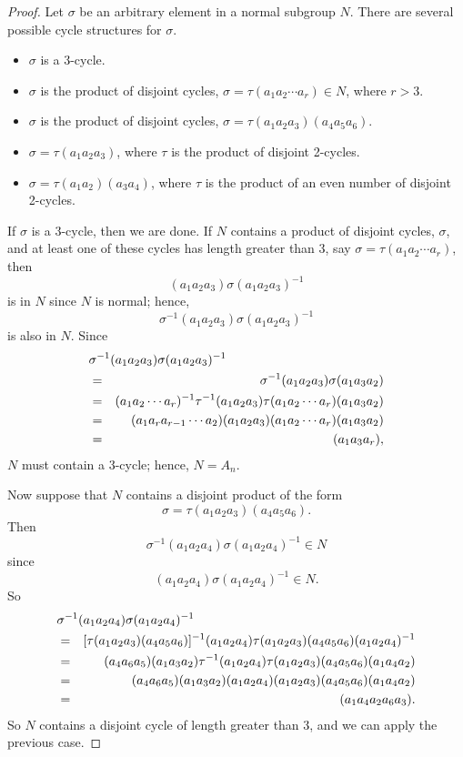  
\begin{proof}
Let $\sigma$ be an arbitrary element in a normal subgroup $N$. There
are several possible cycle structures for $\sigma$.
\begin{itemize}
 
\item
$\sigma$ is a 3-cycle.
 
\item
$\sigma$ is the product of disjoint cycles, $\sigma = \tau(a_1 a_2
\cdots a_r) \in N$, where $r >3$.
 
 
\item
$\sigma$ is the product of disjoint cycles, $\sigma = \tau(a_1 a_2
a_3)(a_4 a_5 a_6)$.
 
 
\item
$\sigma = \tau(a_1 a_2 a_3)$, where $\tau$ is the product of disjoint
2-cycles. 
 
 
\item
$\sigma =
\tau (a_1 a_2) (a_3 a_4) $, where $\tau$ is the product of an even
number of disjoint 2-cycles. 
 
 
\end{itemize}
If $\sigma$ is a $3$-cycle, then we are done. If $N$ contains a
product of disjoint cycles, $\sigma$, and at least one of these cycles
has length greater than 3, say $\sigma = \tau(a_1 a_2 \cdots a_r)$,
then   
$$
(a_1 a_2 a_3)\sigma(a_1 a_2 a_3)^{-1}
$$
is in $N$ since $N$ is normal; hence,
$$
\sigma^{-1}(a_1 a_2 a_3)\sigma(a_1 a_2 a_3)^{-1}
$$
is also in $N$. Since
\begin{eqnarray*}
\lefteqn{\sigma^{-1}(a_1 a_2 a_3)\sigma(a_1 a_2 a_3)^{-1} } \\
& = & \sigma^{-1}(a_1 a_2 a_3)\sigma(a_1 a_3 a_2) \\
& = & (a_1 a_2 \cdots a_r)^{-1}\tau^{-1}(a_1 a_2 a_3) 
      \tau(a_1 a_2 \cdots a_r)(a_1 a_3 a_2) \\
& = & (a_1 a_r a_{r-1} \cdots a_2 )(a_1 a_2 a_3) 
      (a_1 a_2 \cdots a_r)(a_1 a_3 a_2) \\
& = & (a_1 a_3 a_r),
\end{eqnarray*}
$N$ must contain a 3-cycle; hence, $N = A_n$.
 
 
 
 
Now suppose that $N$ contains a disjoint product of the form
$$
\sigma = \tau(a_1 a_2 a_3)(a_4 a_5 a_6).
$$
Then
$$
\sigma^{-1}(a_1 a_2 a_4)\sigma(a_1 a_2 a_4)^{-1} \in N
$$
since
$$
(a_1 a_2 a_4)\sigma(a_1 a_2 a_4)^{-1} \in N.
$$
So
\begin{eqnarray*}
\lefteqn{\sigma^{-1}(a_1 a_2 a_4)\sigma(a_1 a_2 a_4)^{-1} } \\
& = & [ \tau (a_1 a_2 a_3) (a_4 a_5 a_6) ]^{-1}  (a_1 a_2 a_4) 
      \tau (a_1 a_2 a_3) (a_4 a_5 a_6) (a_1 a_2 a_4)^{-1} \\
& = & (a_4 a_6 a_5) (a_1 a_3 a_2) \tau^{-1}(a_1 a_2 a_4)  
      \tau (a_1 a_2 a_3) (a_4 a_5 a_6) (a_1 a_4 a_2) \\
& = & (a_4 a_6 a_5)(a_1 a_3 a_2) (a_1 a_2 a_4)
      (a_1 a_2 a_3) (a_4 a_5 a_6)(a_1 a_4 a_2) \\
& = & (a_1 a_4 a_2 a_6 a_3).
\end{eqnarray*}
So $N$ contains a disjoint cycle of length greater than 3, and we can
apply the previous case. 
 

\end{proof}

